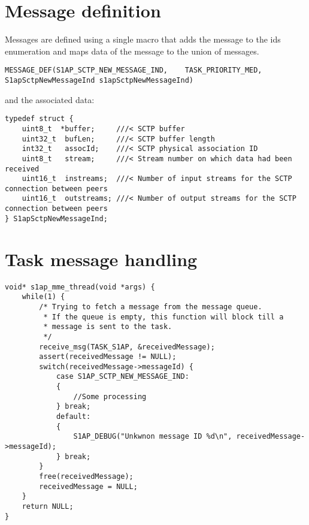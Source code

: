 \documentclass[a4paper,oneside]{report}
\begin{document}
\section{Message definition}
Messages are defined using a single macro that adds the message to the ids enumeration
and maps data of the message to the union of messages.
\begin{lstlisting}
MESSAGE_DEF(S1AP_SCTP_NEW_MESSAGE_IND,    TASK_PRIORITY_MED, S1apSctpNewMessageInd s1apSctpNewMessageInd)
\end{lstlisting}
and the associated data:
\begin{lstlisting}
typedef struct {
    uint8_t  *buffer;     ///< SCTP buffer
    uint32_t  bufLen;     ///< SCTP buffer length
    int32_t   assocId;    ///< SCTP physical association ID
    uint8_t   stream;     ///< Stream number on which data had been received
    uint16_t  instreams;  ///< Number of input streams for the SCTP connection between peers
    uint16_t  outstreams; ///< Number of output streams for the SCTP connection between peers
} S1apSctpNewMessageInd;
\end{lstlisting}
\section{Task message handling}
\begin{lstlisting}
void* s1ap_mme_thread(void *args) {
    while(1) {
        /* Trying to fetch a message from the message queue.
         * If the queue is empty, this function will block till a
         * message is sent to the task.
         */
        receive_msg(TASK_S1AP, &receivedMessage);
        assert(receivedMessage != NULL);
        switch(receivedMessage->messageId) {
            case S1AP_SCTP_NEW_MESSAGE_IND:
            {
                //Some processing
            } break;
            default:
            {
                S1AP_DEBUG("Unkwnon message ID %d\n", receivedMessage->messageId);
            } break;
        }
        free(receivedMessage);
        receivedMessage = NULL;
    }
    return NULL;
}
\end{lstlisting}
\end{document}
